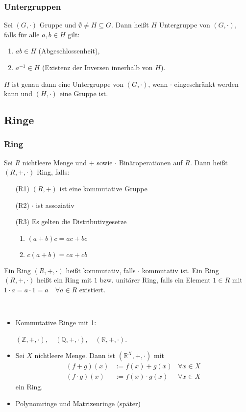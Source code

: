 \subsubsection{Untergruppen}
Sei $ (G, \cdot) $ Gruppe und $ \emptyset \ne H \subseteq G $. Dann heißt $ H $ Untergruppe von $ (G, \cdot) $, falls für alle $ a,b \in H $ gilt:
\begin{enumerate}
	\item $ ab \in H $ (Abgeschlossenheit),
	\item $ a^{-1} \in H $ (Existenz der Inversen innerhalb von $ H $).
\end{enumerate}

\begin{bem}
	$ H $ ist genau dann eine Untergruppe von $ (G, \cdot) $, wenn $ \cdot $ eingeschränkt werden kann und $ (H, \cdot) $ eine Gruppe ist.
\end{bem}


\subsection{Ringe}

\subsubsection{Ring}
Sei $ R $ nichtleere Menge und $ + $ sowie $ \cdot $ Binäroperationen auf $ R $. Dann heißt $ (R,+,\cdot) $ Ring, falls:
\begin{itemize}
	\item[(R1)] $ (R,+) $ ist eine kommutative Gruppe
	\item[(R2)] $ \cdot $ ist assoziativ
	\item[(R3)] Es gelten die Distributivgesetze
	\begin{enumerate}[label={(\alph*)}]
		\item $ (a+b)c = ac+bc $
		\item $ c(a+b) = ca+cb $
	\end{enumerate}
\end{itemize}
Ein Ring $ (R, +, \cdot) $ heißt kommutativ, falls $ \cdot $ kommutativ ist. Ein Ring $ (R,+, \cdot) $ heißt ein Ring mit $ 1 $ bzw. unitärer Ring, falls ein Element $ 1 \in R $ mit $ 1 \cdot a = a \cdot 1 = a \quad \forall a \in R $ existiert.

\begin{bsp}\
	\begin{itemize}
		\item
			Kommutative Ringe mit 1:
			
			$ (\mathbb{Z},+, \cdot), \quad (\mathbb{Q},+, \cdot), \quad (\mathbb{R},+, \cdot) $.
		\item
			Sei $ X $ nichtleere Menge. Dann ist $ (\mathbb{R}^{X},+,\cdot) $ mit 
			\begin{align*}
				(f+g)(x) &:= f(x) + g(x) & \forall x \in X \\
				(f \cdot g)(x) &:= f(x) \cdot g(x) & \forall x \in X
			\end{align*}
			ein Ring.
		\item
			Polynomringe und Matrizenringe (später)
	\end{itemize}
\end{bsp}

